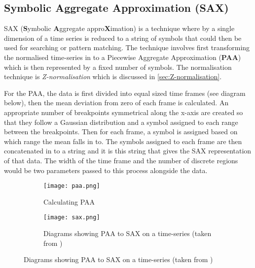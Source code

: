 \documentclass[../report.tex]{subfiles}
\begin{document}
	
	\subsection{Symbolic Aggregate Approximation (SAX)} \label{sec:paasax}
	SAX (\textbf{S}ymbolic \textbf{A}ggregate appro\textbf{X}imation) \citep{sax} is a technique where by a single dimension of a time series is reduced to a string of symbols that could then be used for searching or pattern matching.  The technique involves first transforming the normalised time-series in to a Piecewise Aggregate Approximation (\textbf{PAA}) which is then represented by a fixed number of symbols.  The normalisation technique is \textit{Z-normalisation} which is discussed in \cref{sec:Z-normalisation}.
	
	For the PAA, the data is first divided into equal sized time frames (see diagram below), then the mean deviation from zero of each frame is calculated.  An appropriate number of breakpoints symmetrical along the x-axis are created so that they follow a Gaussian distribution and a symbol assigned to each range between the breakpoints.  Then for each frame, a symbol is assigned based on which range the mean falls in to.  The symbols assigned to each frame are then concatenated in to a string and it is this string that gives the SAX representation of that data.  The width of the time frame and the number of discrete regions would be two parameters passed to this process alongside the data.
	\begin{figure}[h]
		\begin{subfigure}{0.5\linewidth}
			\texttt{[image: paa.png]}
			\caption{Calculating PAA}
		\end{subfigure}
		\begin{subfigure}{0.5\linewidth}
			\texttt{[image: sax.png]}
			\caption{Diagrams showing PAA to SAX on a time-series (taken from \cite{sax})}
		\end{subfigure}
	\end{figure}
\end{document}
